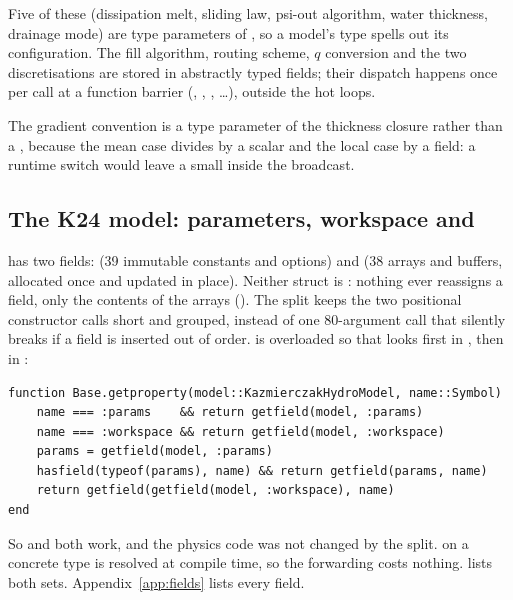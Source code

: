 Five of these (dissipation melt, sliding law, psi-out algorithm, water thickness, drainage mode) are type parameters of
, so a model's type spells out its configuration. The fill algorithm, routing scheme, $q$
conversion and the two discretisations are stored in abstractly typed fields; their dispatch happens once per call at
a function barrier (, , , \ldots), outside the hot loops.

The gradient convention is a type parameter of the thickness closure rather than a , because the mean case
divides by a scalar and the local case by a field: a runtime switch would leave a small  inside the
broadcast.

\subsection{The K24 model: parameters, workspace and }\label{arch:split}
 has two fields:  (39 immutable constants and options) and
 (38 arrays and buffers, allocated once and updated in place). Neither struct is
: nothing ever reassigns a field, only the contents of the arrays (). The split keeps the
two positional constructor calls short and grouped, instead of one 80-argument call that silently breaks if a field is
inserted out of order.  is overloaded so that  looks first in , then
in :
\begin{verbatim}
function Base.getproperty(model::KazmierczakHydroModel, name::Symbol)
    name === :params    && return getfield(model, :params)
    name === :workspace && return getfield(model, :workspace)
    params = getfield(model, :params)
    hasfield(typeof(params), name) && return getfield(params, name)
    return getfield(getfield(model, :workspace), name)
end
\end{verbatim}
So  and  both work, and the physics code was not changed by the split.  on a
concrete type is resolved at compile time, so the forwarding costs nothing.  lists both sets.
Appendix~\ref{app:fields} lists every field.

